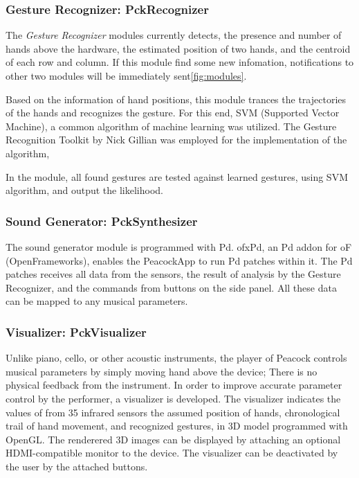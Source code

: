 \documentclass{nime-alternate}
\begin{document}
\subsubsection{Gesture Recognizer: PckRecognizer}

The {\it Gesture Recognizer} modules currently detects, the presence and number of hands above the hardware, the estimated position of two hands, and the centroid of each row and column. 
If this module find some new infomation, notifications to other two modules will be immediately sent\ref{fig:modules}.

Based on the information of hand positions, this module trances the trajectories of the hands and recognizes the gesture. For this end,  SVM (Supported Vector Machine), a common algorithm of machine learning was utilized.  The Gesture Recognition Toolkit by Nick Gillian was employed for the implementation of the algorithm,

In the module, all found gestures are tested against learned gestures, using SVM algorithm, and output the likelihood. 

\subsubsection{Sound Generator: PckSynthesizer}

The sound generator module is programmed with Pd\cite{Pd}. ofxPd\cite{ofxPd}, an Pd addon for oF\\(OpenFrameworks), enables the PeacockApp to run Pd patches within it. The Pd patches receives all data from the sensors, the result of analysis by the Gesture Recognizer, and the commands from buttons on the side panel. All these data can be mapped to any musical parameters.
 
\subsubsection{Visualizer: PckVisualizer}

Unlike piano, cello, or other acoustic instruments, the player of Peacock controls musical parameters by simply moving hand above the device; There is no physical feedback from the instrument. In order to improve accurate parameter control by the performer, a visualizer is developed.  The visualizer indicates the values of from 35 infrared sensors  the assumed position of hands, chronological trail of hand movement, and recognized gestures, in  3D model programmed with OpenGL\cite{OpenGL}. The renderered 3D images can be displayed by attaching an optional HDMI-compatible monitor to the device.
The visualizer can be deactivated by the user by the attached buttons.
\end{document}
